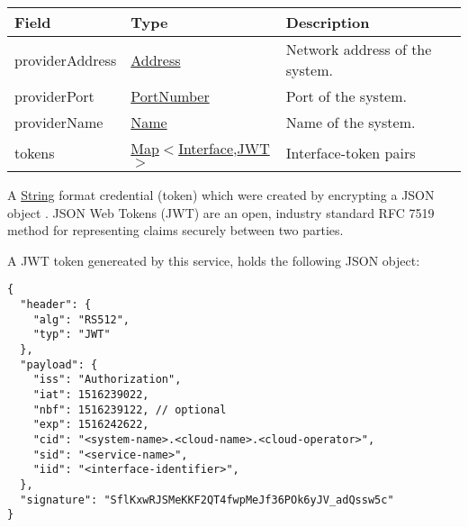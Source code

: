 \documentclass[a4paper]{arrowhead}
\newcommand{\fref}[1]{{\textcolor{ArrowheadBlue}{\hyperref[sec:functions:#1]{#1}}}}
\newcommand{\pref}[1]{{\textcolor{ArrowheadGrey}{\hyperref[sec:model:primitives:#1]{#1}}}}
\begin{document}
\label{sec:model:TokenData}

\begin{table}[ht!]
\begin{tabularx}{\textwidth}{| p{4.25cm} | p{3.5cm} | X |} \hline
\rowcolor{gray!33} Field & Type      & Description \\ \hline
providerAddress & \pref{Address} & Network address of the system. \\ \hline
providerPort & \pref{PortNumber} & Port of the system. \\ \hline
providerName & \pref{Name} & Name of the system. \\ \hline
tokens &  \pref{Map}$<$\pref{Interface},\hyperref[sec:model:JWT]{JWT}$>$ & Interface-token pairs \\ \hline 
\end{tabularx}
\end{table}

\label{sec:model:Token}

A \pref{String} format credential (token) which were created by encrypting a JSON object \cite{bray2014json}. JSON Web Tokens (JWT) are an open, industry standard RFC 7519 method for representing claims securely between two parties.

A JWT token genereated by this service, holds the following JSON object:

\begin{lstlisting}[language=http,label={lst:authorization},caption={Content of a \fref{JWT token} generated by this service.}]
{
  "header": {
    "alg": "RS512",
    "typ": "JWT"
  },
  "payload": {
    "iss": "Authorization",
    "iat": 1516239022,
    "nbf": 1516239122, // optional
    "exp": 1516242622,
    "cid": "<system-name>.<cloud-name>.<cloud-operator>",
    "sid": "<service-name>",
    "iid": "<interface-identifier>",
  },
  "signature": "SflKxwRJSMeKKF2QT4fwpMeJf36POk6yJV_adQssw5c"
}
\end{lstlisting}
\end{document}
